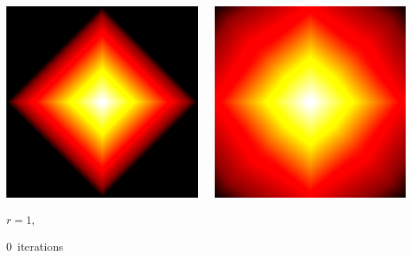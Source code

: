 \documentclass[aspectratio=169,t]{beamer}
\begin{document}
{\begin{columns}
\begin{column}{0.22\textwidth}
			\centering
			\includegraphics[width=.85\textwidth]{data/synthetic_meshes/square_tesselation_4tri_Dirac_delta_1_v13_f16_funcvals_0iter.png}
			{\footnotesize
				\par \vspace{-1mm} $r=1$,
				\par \vspace{-1mm} $0$~iterations
			}
		\end{column}
		\begin{column}{0.22\textwidth}
			\centering
			\includegraphics[width=.85\textwidth]{data/synthetic_meshes/square_tesselation_4tri_Dirac_delta_1_v13_f16_funcvals_1iter.png}

\end{column}
\end{columns}}
\end{document}
